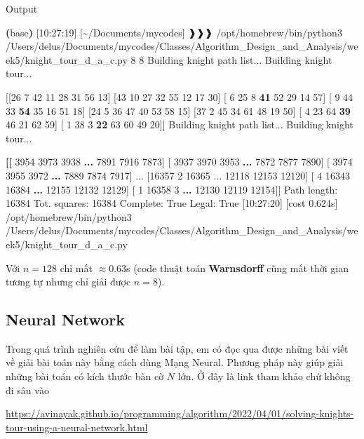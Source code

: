 \documentclass[
]{article}
\newenvironment{Shaded}{\begin{snugshade}}{\end{snugshade}}
\newcommand{\BuiltInTok}[1]{#1}
\newcommand{\ErrorTok}[1]{\textcolor[rgb]{0.64,0.00,0.00}{\textbf{#1}}}
\newcommand{\ExtensionTok}[1]{#1}
\newcommand{\KeywordTok}[1]{\textcolor[rgb]{0.13,0.29,0.53}{\textbf{#1}}}
\newcommand{\NormalTok}[1]{#1}
\begin{document}
Output

\begin{Shaded}
\begin{Highlighting}[]
\KeywordTok{(}\ExtensionTok{base}\KeywordTok{)} \ExtensionTok{[10:27:19]}\NormalTok{ [\textasciitilde{}/Documents/mycodes] ❱❱❱ /opt/homebrew/bin/python3 /Users/delus/Documents/mycodes/Classes/Algorithm\_Design\_and\_Analysis/week5/knight\_tour\_d\_a\_c.py}
\ExtensionTok{8}
\ExtensionTok{8}
\ExtensionTok{Building}\NormalTok{ knight path list...}
\ExtensionTok{Building}\NormalTok{ knight tour...}

\ExtensionTok{[[26}\NormalTok{  7 42 11 28 31 56 13]}
 \ExtensionTok{[43}\NormalTok{ 10 27 32 55 12 17 30]}
 \BuiltInTok{[}\NormalTok{ 6 25  8 }\ErrorTok{41} \ExtensionTok{52}\NormalTok{ 29 14 57]}
 \BuiltInTok{[}\NormalTok{ 9 44 33 }\ErrorTok{54} \ExtensionTok{35}\NormalTok{ 16 51 18]}
 \ExtensionTok{[24}\NormalTok{  5 36 47 40 53 58 15]}
 \ExtensionTok{[37}\NormalTok{  2 45 34 61 48 19 50]}
 \BuiltInTok{[}\NormalTok{ 4 23 64 }\ErrorTok{39} \ExtensionTok{46}\NormalTok{ 21 62 59]}
 \BuiltInTok{[}\NormalTok{ 1 38  3 }\ErrorTok{22} \ExtensionTok{63}\NormalTok{ 60 49 20]]}
\ExtensionTok{Building}\NormalTok{ knight path list...}
\ExtensionTok{Building}\NormalTok{ knight tour...}

\KeywordTok{[[}\NormalTok{ 3954  3973  3938 }\ErrorTok{...}  \ExtensionTok{7891}\NormalTok{  7916  7873]}
 \BuiltInTok{[}\NormalTok{ 3937  3970  3953 }\ErrorTok{...}  \ExtensionTok{7872}\NormalTok{  7877  7890]}
 \BuiltInTok{[}\NormalTok{ 3974  3955  3972 }\ErrorTok{...}  \ExtensionTok{7889}\NormalTok{  7874  7917]}
 \ExtensionTok{...}
 \ExtensionTok{[16357}\NormalTok{     2 16365 ... 12118 12153 12120]}
 \BuiltInTok{[}\NormalTok{    4 16343 16384 }\ErrorTok{...} \ExtensionTok{12155}\NormalTok{ 12132 12129]}
 \BuiltInTok{[}\NormalTok{    1 16358     3 }\ErrorTok{...} \ExtensionTok{12130}\NormalTok{ 12119 12154]]}
\ExtensionTok{Path}\NormalTok{ length: 16384}
\ExtensionTok{Tot.}\NormalTok{ squares: 16384}
\ExtensionTok{Complete:}\NormalTok{        True}
\ExtensionTok{Legal:}\NormalTok{           True}
\ExtensionTok{[10:27:20]}\NormalTok{ [cost 0.624s] /opt/homebrew/bin/python3 /Users/delus/Documents/mycodes/Classes/Algorithm\_Design\_and\_Analysis/week5/knight\_tour\_d\_a\_c.py}
\end{Highlighting}
\end{Shaded}

Với \(n = 128\) chỉ mất \(\approx 0.63\)s (code thuật toán
\textbf{Warnsdorff} cũng mất thời gian tương tự nhưng chỉ giải được
\(n=8\)).

\hypertarget{neural-network}{%
\subsection{Neural Network}\label{neural-network}}

Trong quá trình nghiên cứu để làm bài tập, em có đọc qua được những bài
viết về giải bài toán này bằng cách dùng Mạng Neural. Phương pháp này
giúp giải những bài toán có kích thước bàn cờ \(N\) lớn. Ở đây là link
tham khảo chứ không đi sâu vào

\url{https://avinayak.github.io/programming/algorithm/2022/04/01/solving-knights-tour-using-a-neural-network.html}
\end{document}

